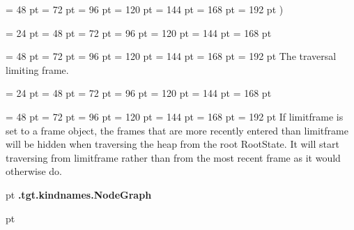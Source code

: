 {{{{\par \noindent  \leftskip = 48 pt  \leftmargini = 72 pt  \leftmarginii = 96 pt  \leftmarginiii = 120 pt  \leftmarginiv = 144 pt  \leftmarginv = 168 pt  \leftmarginvi = 192 pt  )\par}
\par}
\par}
{\par \noindent  \leftskip = 24 pt  \leftmargini = 48 pt  \leftmarginii = 72 pt  \leftmarginiii = 96 pt  \leftmarginiv = 120 pt  \leftmarginv = 144 pt  \leftmarginvi = 168 pt {\par \noindent
{\par \noindent  \leftskip = 48 pt  \leftmargini = 72 pt  \leftmarginii = 96 pt  \leftmarginiii = 120 pt  \leftmarginiv = 144 pt  \leftmarginv = 168 pt  \leftmarginvi = 192 pt  The traversal limiting frame.\par}
\par}
\par}
{\par \noindent  \leftskip = 24 pt  \leftmargini = 48 pt  \leftmarginii = 72 pt  \leftmarginiii = 96 pt  \leftmarginiv = 120 pt  \leftmarginv = 144 pt  \leftmarginvi = 168 pt {\par \noindent
{\par \noindent  \leftskip = 48 pt  \leftmargini = 72 pt  \leftmarginii = 96 pt  \leftmarginiii = 120 pt  \leftmarginiv = 144 pt  \leftmarginv = 168 pt  \leftmarginvi = 192 pt  If limitframe is set to a frame object, the frames that are more
recently entered than limitframe will be hidden when traversing the
heap from the root RootState. It will start traversing from limitframe
rather than from the most recent frame as it would otherwise do.
\par}
\par}
\par}
\par}
{\par \pagebreak[3]  pt \noindent
{\LARGE {\bf .tgt.kindnames.NodeGraph\/}}\par {} pt
} \noindent
